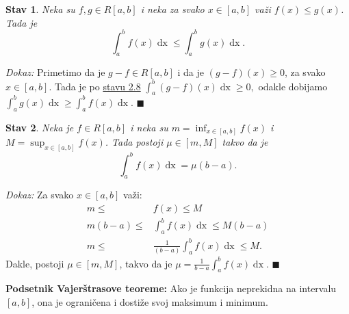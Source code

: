 \documentclass{article}
\newtheorem{stav}{Stav}[section]
\DeclareMathOperator{\dx}{dx}
\begin{document}
\begin{stavbox}
    \label{stav_2.10}
    \begin{stav}
        Neka su $f, g \in R\left[a,b\right]$ i neka za svako $x \in \left[a, b\right]$ važi $f\left(x\right) \leq g\left(x\right)$. Tada je $$\displaystyle \int^b_a f\left(x\right) \dx \leq \int^b_a g\left(x\right)\dx.$$
    \end{stav}
\end{stavbox}

\textit{Dokaz:} Primetimo da je $g-f \in R\left[a, b\right]$ i da je $\left(g-f\right)\left(x\right) \geq 0$, za svako $x\in\left[a,b\right]$. Tada je po
\hyperref[stav_2.8]{stavu 2.8} $\displaystyle \int^b_a \left(g-f\right)\left(x\right)\dx \geq 0,$
odakle dobijamo $\displaystyle \int^b_a g\left(x\right)\dx \geq  \int^b_a f\left(x\right)\dx $.
\null\hfill $\blacksquare$\par

\begin{stavbox}
    \label{stav_2.11}
    \begin{stav}
        Neka je $f \in R\left[a, b\right]$ i neka su $\displaystyle m = \inf_{x\in \left[a, b\right]} f\left(x\right)$ i $\displaystyle M = \sup_{x \in \left[a,b\right]} f\left(x\right)$. Tada postoji $\mu \in \left[m, M\right]$ takvo da je
        $$\displaystyle \int^b_a f\left(x\right) \dx = \mu\left(b-a\right).$$
    \end{stav}
\end{stavbox}

\textit{Dokaz:} Za svako $x \in \left[a, b\right]$ važi:
\begin{align*}
    m \leq                 & f\left(x\right) \leq M                                        \\
    m\left(b-a\right) \leq & \int^b_a f\left(x\right)\dx \leq M\left(b-a\right)            \\
    m \leq                 & \frac{1}{\left(b-a\right)}\int^b_a f\left(x\right)\dx \leq M.
\end{align*}
Dakle, postoji $\mu\in\left[m, M\right]$, takvo da je $\displaystyle \mu=\frac{1}{b-a}\int^b_a f\left(x\right)\dx$.
\null\hfill $\blacksquare$\par

\begin{teoremabox}
    \label{podsetnik_teoreme_3}
    \textbf{Podsetnik Vajerštrasove teoreme:} Ako je funkcija neprekidna na intervalu $\left[a,b\right]$, ona je ograničena i
    dostiže svoj maksimum i minimum.
\end{teoremabox}
\end{document}
